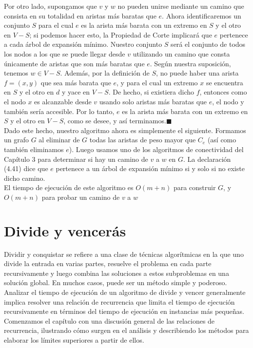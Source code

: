 \documentclass[a4paper]{article}
\begin{document}
Por otro lado, supongamos que $v$ y $w$ no pueden unirse mediante un camino que consista en su totalidad en aristas más baratas que $e$. Ahora identificaremos un conjunto $S$ para el cual $e$ es la arista más barata con un extremo en $S$ y el otro en $V-S$; si podemos hacer esto, la Propiedad de Corte implicará que $e$ pertenece a cada árbol de expansión mínimo. Nuestro conjunto $S$ será el conjunto de todos los nodos a los que se puede llegar desde $v$ utilizando un camino que consta únicamente de aristas que son más baratas que $e$. Según nuestra suposición, tenemos $w∈V-S$. Además, por la definición de $S$, no puede haber una arista $f=(x,y)$ que sea más barata que $e$, y para el cual un extremo $x$ se encuentra en $S$ y el otro en $d$ y yace en $V-S$. De hecho, si existiera dicho $f$, entonces como el nodo $x$ es alcanzable desde $v$ usando solo aristas más baratas que $e$, el nodo y también sería accesible. Por lo tanto, $e$ es la arista más barata con un extremo en $S$ y el otro en $V-S$, como se desee, y así terminamos.$\blacksquare$\\

Dado este hecho, nuestro algoritmo ahora es simplemente el siguiente. Formamos un grafo $G$ al eliminar de $G$ todas las aristas de peso mayor que $C_e$ (así como también eliminamos $e$). Luego usamos uno de los algoritmos de conectividad del Capítulo 3 para determinar si hay un camino de $v$ a $w$ en $G$. La declaración (4.41) dice que $e$ pertenece a un árbol de expansión mínimo si y solo si no existe dicho camino.\\

El tiempo de ejecución de este algoritmo es $O(m+n)$ para construir $G$, y $O(m+n)$ para probar un camino de $v$ a $w$\\


\section{Divide y vencerás}

Dividir y conquistar se refiere a una clase de técnicas algorítmicas en la que uno divide la entrada en varias partes, resuelve el problema en cada parte recursivamente y luego combina las soluciones a estos subproblemas en una solución global. En muchos casos, puede ser un método simple y poderoso.\\

Analizar el tiempo de ejecución de un algoritmo de divide y vencer generalmente implica resolver una relación de recurrencia que limita el tiempo de ejecución recursivamente en términos del tiempo de ejecución en instancias más pequeñas. Comenzamos el capítulo con una discusión general de las relaciones de recurrencia, ilustrando cómo surgen en el análisis y describiendo los métodos para elaborar los límites superiores a partir de ellos.\\
\end{document}
